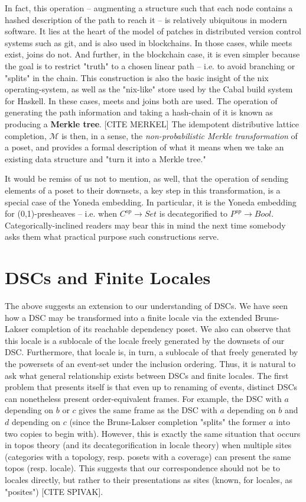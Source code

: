 \documentclass[hoptionsi,review,format=acmsmall]{acmart}
\theoremstyle{definition}
\newcommand{\Mcc}{\mathcal{M}}
\begin{document}
In fact, this operation -- augmenting a structure such that each node contains a hashed description of the path to reach it -- is relatively ubiquitous in modern software. It lies at the heart of the model of patches in distributed version control systems such as git, and is also used in blockchains. In those cases, while meets exist, joins do not. And further, in the blockchain case, it is even simpler because the goal is to restrict "truth" to a chosen linear path -- i.e. to avoid branching or "splits" in the chain. This construction is also the basic insight of the nix operating-system, as well as the "nix-like" store used by the Cabal build system for Haskell. In these cases, meets and joins both are used. The operation of generating the path information and taking a hash-chain of it is known as producing a \textbf{Merkle tree}. [CITE MERKEL] The idempotent distributive lattice completion, \(\Mcc\) is then, in a sense, the \textit{non-probabilistic Merkle transformation} of a poset, and provides a formal description of what it means when we take an existing data structure and "turn it into a Merkle tree."

It would be remiss of us not to mention, as well, that the operation of sending elements of a poset to their downsets, a key step in this transformation, is a special case of the Yoneda embedding. In particular, it is the Yoneda embedding for (0,1)-presheaves -- i.e. when \(C^{op} \rightarrow Set\) is decategorified to \(P^{op} \rightarrow Bool\). Categorically-inclined readers may bear this in mind the next time somebody asks them what practical purpose such constructions serve.


\section{DSCs and Finite Locales}

The above suggests an extension to our understanding of DSCs. We have seen how a DSC may be transformed into a finite locale via the extended Bruns-Lakser completion of its reachable dependency poset. We also can observe that this locale is a sublocale of the locale freely generated by the downsets of our DSC. Furthermore, that locale is, in turn, a sublocale of that freely generated by the powersets of an event-set under the inclusion ordering. Thus, it is natural to ask what general relationship exists between DSCs and finite locales. The first problem that presents itself is that even up to renaming of events, distinct DSCs can nonetheless present order-equivalent frames. For example, the DSC with \(a\) depending on \(b\) or \(c\) gives the same frame as the DSC with \(a\) depending on \(b\) and \(d\) depending on \(c\) (since the Bruns-Lakser completion "splits" the former \(a\) into two copies to begin with). However, this is exactly the same situation that occurs in topos theory (and its decategorification in locale theory) when multiple sites (categories with a topology, resp. posets with a coverage) can present the same topos (resp. locale). This suggests that our correspondence should not be to locales directly, but rather to their presentations as sites (known, for locales, as "posites") [CITE SPIVAK].
\end{document}

